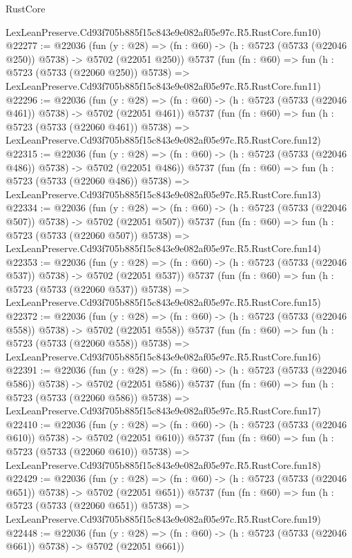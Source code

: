 \begin{lexlean}{RustCore}
\begin{coremodule}
    LexLeanPreserve.Cd93f705b885f15c843e9e082af05e97c.R5.RustCore.fun10)
@22277 := @22036
    (fun (y : @28) => (fn : @60) -> (h : @5723 (@5733 (@22046 @250)) @5738) -> @5702 (@22051 @250))
    @5737
    (fun (fn : @60) =>
    fun (h : @5723 (@5733 (@22060 @250)) @5738) =>
    LexLeanPreserve.Cd93f705b885f15c843e9e082af05e97c.R5.RustCore.fun11)
@22296 := @22036
    (fun (y : @28) => (fn : @60) -> (h : @5723 (@5733 (@22046 @461)) @5738) -> @5702 (@22051 @461))
    @5737
    (fun (fn : @60) =>
    fun (h : @5723 (@5733 (@22060 @461)) @5738) =>
    LexLeanPreserve.Cd93f705b885f15c843e9e082af05e97c.R5.RustCore.fun12)
@22315 := @22036
    (fun (y : @28) => (fn : @60) -> (h : @5723 (@5733 (@22046 @486)) @5738) -> @5702 (@22051 @486))
    @5737
    (fun (fn : @60) =>
    fun (h : @5723 (@5733 (@22060 @486)) @5738) =>
    LexLeanPreserve.Cd93f705b885f15c843e9e082af05e97c.R5.RustCore.fun13)
@22334 := @22036
    (fun (y : @28) => (fn : @60) -> (h : @5723 (@5733 (@22046 @507)) @5738) -> @5702 (@22051 @507))
    @5737
    (fun (fn : @60) =>
    fun (h : @5723 (@5733 (@22060 @507)) @5738) =>
    LexLeanPreserve.Cd93f705b885f15c843e9e082af05e97c.R5.RustCore.fun14)
@22353 := @22036
    (fun (y : @28) => (fn : @60) -> (h : @5723 (@5733 (@22046 @537)) @5738) -> @5702 (@22051 @537))
    @5737
    (fun (fn : @60) =>
    fun (h : @5723 (@5733 (@22060 @537)) @5738) =>
    LexLeanPreserve.Cd93f705b885f15c843e9e082af05e97c.R5.RustCore.fun15)
@22372 := @22036
    (fun (y : @28) => (fn : @60) -> (h : @5723 (@5733 (@22046 @558)) @5738) -> @5702 (@22051 @558))
    @5737
    (fun (fn : @60) =>
    fun (h : @5723 (@5733 (@22060 @558)) @5738) =>
    LexLeanPreserve.Cd93f705b885f15c843e9e082af05e97c.R5.RustCore.fun16)
@22391 := @22036
    (fun (y : @28) => (fn : @60) -> (h : @5723 (@5733 (@22046 @586)) @5738) -> @5702 (@22051 @586))
    @5737
    (fun (fn : @60) =>
    fun (h : @5723 (@5733 (@22060 @586)) @5738) =>
    LexLeanPreserve.Cd93f705b885f15c843e9e082af05e97c.R5.RustCore.fun17)
@22410 := @22036
    (fun (y : @28) => (fn : @60) -> (h : @5723 (@5733 (@22046 @610)) @5738) -> @5702 (@22051 @610))
    @5737
    (fun (fn : @60) =>
    fun (h : @5723 (@5733 (@22060 @610)) @5738) =>
    LexLeanPreserve.Cd93f705b885f15c843e9e082af05e97c.R5.RustCore.fun18)
@22429 := @22036
    (fun (y : @28) => (fn : @60) -> (h : @5723 (@5733 (@22046 @651)) @5738) -> @5702 (@22051 @651))
    @5737
    (fun (fn : @60) =>
    fun (h : @5723 (@5733 (@22060 @651)) @5738) =>
    LexLeanPreserve.Cd93f705b885f15c843e9e082af05e97c.R5.RustCore.fun19)
@22448 := @22036
    (fun (y : @28) => (fn : @60) -> (h : @5723 (@5733 (@22046 @661)) @5738) -> @5702 (@22051 @661))

\end{coremodule}
\end{lexlean}
